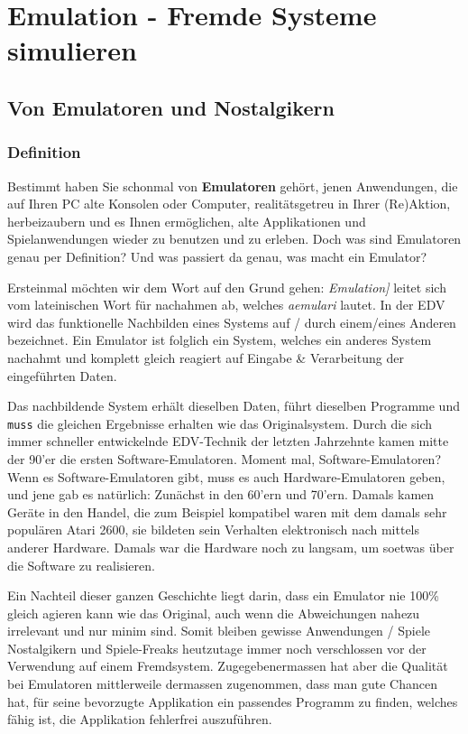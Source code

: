 \documentclass[a4paper,10pt,dvips,fleqn,titlepage,twoside]{book}
\begin{document}
\part{Emulation - Fremde Systeme simulieren}
\chapter{Von Emulatoren und Nostalgikern}
\section{Definition}
Bestimmt haben Sie schonmal von \textbf{Emulatoren} gehört, jenen Anwendungen, die auf Ihren PC alte Konsolen oder Computer, realitätsgetreu in Ihrer (Re)Aktion, herbeizaubern und es Ihnen ermöglichen, alte Applikationen und Spielanwendungen wieder zu benutzen und zu erleben. Doch was sind Emulatoren genau per Definition? Und was passiert da genau, was macht ein Emulator?\newline

Ersteinmal möchten wir dem Wort auf den Grund gehen: \emph{Emulation]} leitet sich vom lateinischen Wort für nachahmen ab, welches \emph{aemulari} lautet.
In der EDV wird das funktionelle Nachbilden eines Systems auf / durch einem/eines Anderen bezeichnet. Ein Emulator ist folglich ein System, welches ein anderes System nachahmt und komplett gleich reagiert auf Eingabe \& Verarbeitung der eingeführten Daten.

Das nachbildende System erhält dieselben Daten, führt dieselben Programme und \texttt{muss} die gleichen Ergebnisse erhalten wie das Originalsystem. Durch die sich immer schneller entwickelnde EDV-Technik der letzten Jahrzehnte kamen mitte der 90'er die ersten Software-Emulatoren. Moment mal, Software-Emulatoren? Wenn es Software-Emulatoren gibt, muss es auch Hardware-Emulatoren geben, und jene gab es natürlich: Zunächst in den 60'ern und 70'ern. Damals kamen Geräte in den Handel, die zum Beispiel kompatibel waren mit dem damals sehr populären Atari 2600, sie bildeten sein Verhalten elektronisch nach mittels anderer Hardware. Damals war die Hardware noch zu langsam, um soetwas über die Software zu realisieren.

Ein Nachteil dieser ganzen Geschichte liegt darin, dass ein Emulator nie 100\% gleich agieren kann wie das Original, auch wenn die Abweichungen nahezu irrelevant und nur minim sind. Somit bleiben gewisse Anwendungen / Spiele Nostalgikern und Spiele-Freaks heutzutage immer noch verschlossen vor der Verwendung auf einem Fremdsystem. Zugegebenermassen hat aber die Qualität bei Emulatoren mittlerweile dermassen zugenommen, dass man gute Chancen hat, für seine bevorzugte Applikation ein passendes Programm zu finden, welches fähig ist, die Applikation fehlerfrei auszuführen.
\end{document}
